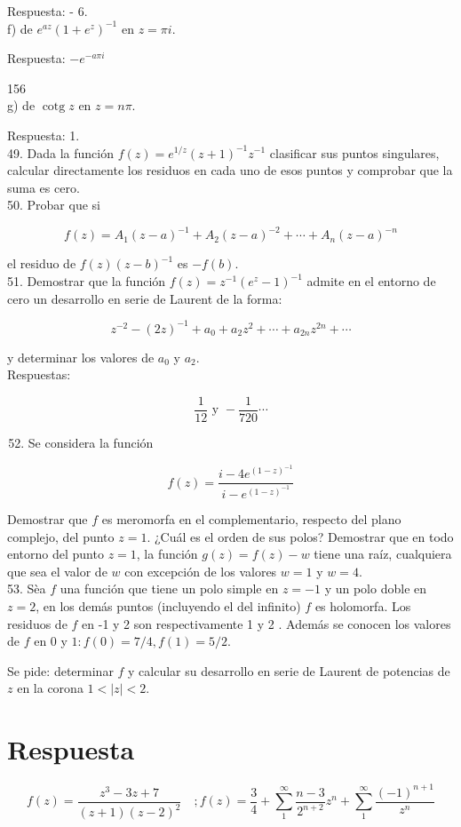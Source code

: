 \documentclass[10pt]{article}
\theoremstyle{plain}
\theoremstyle{definition}
\theoremstyle{remark}
\begin{document}
Respuesta: - 6.\\
f) de $e^{a z}\left(1+e^{z}\right)^{-1}$ en $z=\pi i$.

Respuesta: $-e^{-a \pi i}$

156\\
g) de $\operatorname{cotg} z$ en $z=n \pi$.

Respuesta: 1.\\
49. Dada la función $f(z)=e^{1 / z}(z+1)^{-1} z^{-1}$ clasificar sus puntos singulares, calcular directamente los residuos en cada uno de esos puntos y comprobar que la suma es cero.\\
50. Probar que si

$$
f(z)=A_{1}(z-a)^{-1}+A_{2}(z-a)^{-2}+\cdots+A_{n}(z-a)^{-n}
$$

el residuo de $f(z)(z-b)^{-1}$ es $-f(b)$.\\
51. Demostrar que la función $f(z)=z^{-1}\left(e^{z}-1\right)^{-1}$ admite en el entorno de cero un desarrollo en serie de Laurent de la forma:

$$
z^{-2}-(2 z)^{-1}+a_{0}+a_{2} z^{2}+\cdots+a_{2 n} z^{2 n}+\cdots
$$

y determinar los valores de $a_{0}$ y $a_{2}$.\\
Respuestas:

$$
\frac{1}{12} \text { y }-\frac{1}{720} \cdots
$$

\begin{enumerate}
  \setcounter{enumi}{51}
  \item Se considera la función
\end{enumerate}

$$
f(z)=\frac{i-4 e^{(1-z)^{-1}}}{i-e^{(1-z)^{-1}}}
$$

Demostrar que $f$ es meromorfa en el complementario, respecto del plano complejo, del punto $z=1$. ¿Cuál es el orden de sus polos? Demostrar que en todo entorno del punto $z=1$, la función $g(z)=f(z)-w$ tiene una raíz, cualquiera que sea el valor de $w$ con excepción de los valores $w=1$ y $w=4$.\\
53. Sèa $f$ una función que tiene un polo simple en $z=-1$ y un polo doble en $z=2$, en los demás puntos (incluyendo el del infinito) $f$ es holomorfa. Los residuos de $f$ en -1 y 2 son respectivamente 1 y 2 . Además se conocen los valores de $f$ en 0 y $1: f(0)=7 / 4, f(1)=5 / 2$.

Se pide: determinar $f$ y calcular su desarrollo en serie de Laurent de potencias de $z$ en la corona $1<|z|<2$.

\section*{Respuesta}
$$
f(z)=\frac{z^{3}-3 z+7}{(z+1)(z-2)^{2}} \quad ; f(z)=\frac{3}{4}+\sum_{1}^{\infty} \frac{n-3}{2^{n+2}} z^{n}+\sum_{1}^{\infty} \frac{(-1)^{n+1}}{z^{n}}
$$
\end{document}
